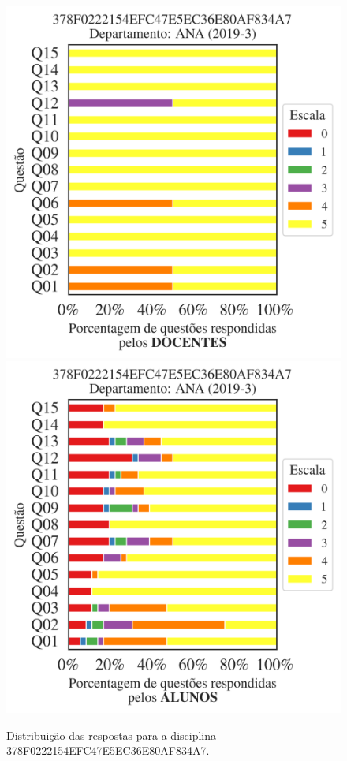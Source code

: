 \documentclass[a4paper,10pt]{article}
\begin{document}
\begin{figure}[h]
\centering
\includegraphics[width=0.485\linewidth]{analise_disciplina_departamento_ANA_378F0222154EFC47E5EC36E80AF834A7_docentes.png}
\includegraphics[width=0.485\linewidth]{analise_disciplina_departamento_ANA_378F0222154EFC47E5EC36E80AF834A7_alunos.png}
\caption{\label{fig:analise_geral_departamento}                Distribuição das respostas para a disciplina 378F0222154EFC47E5EC36E80AF834A7. }
\end{figure}
\end{document}
